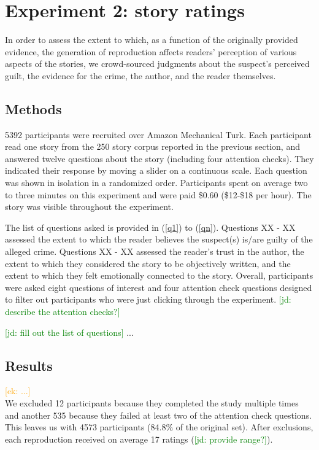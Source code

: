 \documentclass[10pt,letterpaper]{article}
\newcommand{\ek}[1]{\textcolor{Orange}{[ek: #1]}}
\newcommand{\jd}[1]{\textcolor{Green}{[jd: #1]}}
\begin{document}
\section{Experiment 2: story ratings}
In order to assess the extent to which, as a function of the originally provided evidence, the generation of reproduction affects readers' perception of various aspects of the stories, we crowd-sourced judgments about the suspect's perceived guilt, the evidence for the crime, the author, and the reader themselves.

\subsection{Methods}
5392 participants were recruited over Amazon Mechanical Turk. Each participant read one story from the 250 story corpus reported in the previous section, and answered twelve questions about the story (including four attention checks). They indicated their response by moving a slider on a continuous scale. Each question was shown in isolation in a randomized order. Participants spent on average two to three minutes on this experiment and were paid \$0.60 (\$12-\$18 per hour). The story was visible throughout the experiment.


The list of questions asked is provided in (\ref{q1}) to (\ref{qn}). Questions XX - XX assessed the extent to which the reader believes the suspect(s) is/are guilty of the alleged crime. Questions XX - XX assessed the  reader's trust in the author, the extent to which they considered the story to be objectively written, and the extent to which they felt emotionally connected to the story. Overall, participants were asked eight questions of interest and four attention check questions designed to filter out participants who were just clicking through the experiment. \jd{describe the attention checks?}

\jd{fill out the list of questions}
...


\subsection{Results}
\ek{...}\\
We excluded 12 participants because they completed the study multiple times and another 535 because they failed at least two of the attention check questions. This leaves us with 4573 participants (84.8\% of the original set). After exclusions, each reproduction received on average 17 ratings (\jd{provide range?}).
\end{document}
